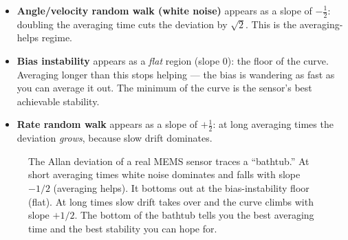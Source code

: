 \begin{itemize}
\item \textbf{Angle/velocity random walk (white noise)} appears as a slope of
$-\tfrac12$: doubling the averaging time cuts the deviation by $\sqrt 2$. This is
the averaging-helps regime.
\item \textbf{Bias instability} appears as a \emph{flat} region (slope $0$): the
floor of the curve. Averaging longer than this stops helping --- the bias is
wandering as fast as you can average it out. The minimum of the curve is the
sensor's best achievable stability.
\item \textbf{Rate random walk} appears as a slope of $+\tfrac12$: at long
averaging times the deviation \emph{grows}, because slow drift dominates.
\end{itemize}

\begin{figure}[H]
\centering
{}
\caption{The Allan deviation of a real MEMS sensor traces a ``bathtub.'' At short
averaging times white noise dominates and falls with slope $-1/2$ (averaging
helps). It bottoms out at the bias-instability floor (flat). At long times slow
drift takes over and the curve climbs with slope $+1/2$. The bottom of the
bathtub tells you the best averaging time and the best stability you can hope
for.}
\label{ch35:fig-allan}
\end{figure}

